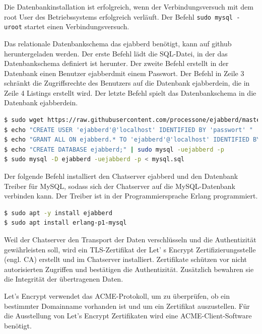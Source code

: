 \documentclass[a4paper,titlepage,halfparskip,12pt]{scrreprt}
\begin{document}
\begin{onehalfspacing}
Die Datenbankinstallation ist erfolgreich, wenn der Verbindungsversuch mit dem root User des Betriebssystems erfolgreich verläuft. Der Befehl \texttt{sudo mysql -uroot} startet einen Verbindungsversuch.

Das relationale Datenbankschema das ejabberd benötigt, kann auf github heruntergeladen werden. Der erste Befehl lädt die SQL-Datei, in der das Datenbankschema definiert ist herunter. Der zweite Befehl erstellt in der Datenbank einen Benutzer \glqq ejabberd\grqq mit einem Passwort. Der Befehl in Zeile 3 schränkt die Zugriffsrechte des Benutzers auf die Datenbank \glqq ejabberd\grqq ein, die in Zeile 4 Listings erstellt wird. Der letzte Befehl spielt das Datenbankschema in die Datenbank \glqq ejabberd\grqq ein.

\bigskip

 \begin{lstlisting}[language=bash, caption={Installation der Mysql-Datenbank}]
$ sudo wget https://raw.githubusercontent.com/processone/ejabberd/master/sql/mysql.sql
$ echo "CREATE USER 'ejabberd'@'localhost' IDENTIFIED BY 'passwort' " | sudo mysql -uroot
$ echo "GRANT ALL ON ejabberd.* TO 'ejabberd'@'localhost' IDENTIFIED BY 'passwort';" | sudo mysql -uroot
$ echo "CREATE DATABASE ejabberd;" | sudo mysql -uejabberd -p
$ sudo mysql -D ejabberd -uejabberd -p < mysql.sql
\end{lstlisting}



Der folgende Befehl installiert den Chatserver ejabberd und den Datenbank Treiber für MySQL, sodass sich der Chatserver auf die MySQL-Datenbank verbinden kann. Der Treiber ist in der Programmiersprache Erlang programmiert.

\bigskip

\begin{lstlisting}[language=bash, caption={Installation von ejabberd und des MySQL Datenbanktreibers}]
$ sudo apt -y install ejabberd
$ sudo apt install erlang-p1-mysql
\end{lstlisting}

Weil der Chatserver den Transport der Daten verschlüsseln und die Authentizität gewährleisten soll, wird ein TLS-Zertifikat der Let' s Encrypt Zertifizierungsstelle (engl. \ac{CA}) erstellt und im Chatserver installiert. Zertifikate schützen vor nicht autorisierten Zugriffen und bestätigen die Authentizität. Zusätzlich bewahren sie die Integrität der übertragenen Daten.\cite{melzer2010web}

Let's Encrypt verwendet das ACME-Protokoll, um zu überprüfen, ob ein bestimmter Domainname vorhanden ist und um ein Zertifikat auszustellen. Für die Ausstellung von Let's Encrypt Zertifikaten wird eine ACME-Client-Software benötigt.\cite{letsencryptACME}


\end{onehalfspacing}
\end{document}
